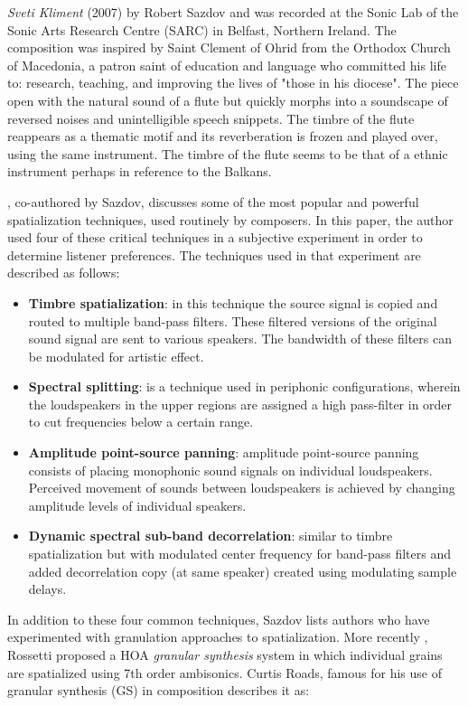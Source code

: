 \textit{Sveti Kliment} (2007) by Robert Sazdov and was recorded at the Sonic Lab of the Sonic Arts Research Centre (SARC) in Belfast, Northern Ireland. The composition was inspired by Saint Clement of Ohrid from the Orthodox Church of Macedonia, a patron saint of education and language who committed his life to: research, teaching, and improving the lives of "those in his diocese". The piece open with the natural sound of a flute but quickly morphs into a soundscape of reversed noises and unintelligible speech snippets. The timbre of the flute reappears as a thematic motif and its reverberation is frozen and played over, using the same instrument. The timbre of the flute seems to be that of a ethnic instrument perhaps in reference to the Balkans. 

\cite{lynch2017perceptual}, co-authored by Sazdov, discusses some of the most popular and powerful spatialization techniques, used routinely by composers. In this paper, the author used four of these critical techniques in a subjective experiment in order to determine listener preferences. The techniques used in that experiment are described as follows:

\begin{itemize}
    \item \textbf{Timbre spatialization}: in this technique the source signal is copied and routed to multiple band-pass filters. These filtered versions of the original sound signal are sent to various speakers. The bandwidth of these filters can be modulated for artistic effect. 
    \item \textbf{Spectral splitting}: is a technique used in periphonic configurations, wherein the loudspeakers in the upper regions are assigned a high pass-filter in order to cut frequencies below a certain range. 
    \item \textbf{Amplitude point-source panning}: amplitude point-source panning consists of placing monophonic sound signals on individual loudspeakers. Perceived movement of sounds between loudspeakers is achieved by changing amplitude levels of individual speakers.
    \item \textbf{Dynamic spectral sub-band decorrelation}: similar to timbre spatialization but with modulated center frequency for band-pass filters and added decorrelation copy (at same speaker) created using modulating sample delays. 
\end{itemize}

In addition to these four common techniques, Sazdov lists authors who have experimented with granulation approaches to spatialization. More recently \cite{rossetti2020studying}, Rossetti proposed a HOA \textit{granular synthesis} system in which individual grains are spatialized using 7th order ambisonics. Curtis Roads, famous for his use of granular synthesis (GS) in composition describes it as:

